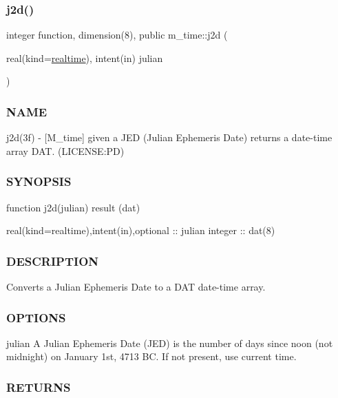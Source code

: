 \subsubsection{\texorpdfstring{j2d()}{j2d()}}
{\footnotesize\ttfamily integer function, dimension(8), public m\+\_\+time\+::j2d (\begin{DoxyParamCaption}\item[{real(kind=\mbox{\hyperlink{namespacem__time_ac10ea9e8d59ec74eaa7d89f2517d7422}{realtime}}), intent(in)}]{julian }\end{DoxyParamCaption})}



\subsubsection*{N\+A\+ME}

j2d(3f) -\/ \mbox{[}M\+\_\+time\mbox{]} given a J\+ED (Julian Ephemeris Date) returns a date-\/time array D\+AT. (L\+I\+C\+E\+N\+SE\+:PD) 

\subsubsection*{S\+Y\+N\+O\+P\+S\+IS}

\begin{DoxyVerb}function j2d(julian) result (dat)

 real(kind=realtime),intent(in),optional :: julian
 integer                                 :: dat(8)
\end{DoxyVerb}


\subsubsection*{D\+E\+S\+C\+R\+I\+P\+T\+I\+ON}

Converts a Julian Ephemeris Date to a D\+AT date-\/time array.

\subsubsection*{O\+P\+T\+I\+O\+NS}

julian A Julian Ephemeris Date (J\+ED) is the number of days since noon (not midnight) on January 1st, 4713 BC. If not present, use current time.

\subsubsection*{R\+E\+T\+U\+R\+NS}

